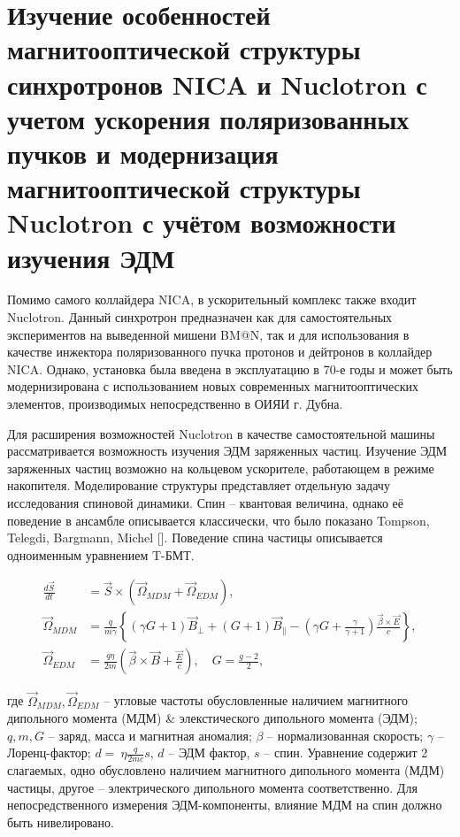 
	\chapter{Изучение особенностей магнитооптической структуры синхротронов NICA и Nuclotron с учетом ускорения поляризованных пучков и модернизация магнитооптической структуры Nuclotron с учётом возможности изучения ЭДМ}\label{ch:EDM}

\par Помимо самого коллайдера NICA, в ускорительный комплекс также входит Nuclotron. Данный синхротрон предназначен как для самостоятельных экспериментов на выведенной мишени BM@N, так и для использования в качестве инжектора поляризованного пучка протонов и дейтронов в коллайдер NICA. Однако, установка была введена в эксплуатацию в 70-е годы и может быть модернизирована с использованием новых современных магнитооптических элементов, производимых непосредственно в ОИЯИ г. Дубна.

\par Для расширения возможностей Nuclotron в качестве самостоятельной машины рассматривается возможность изучения ЭДМ заряженных частиц. Изучение ЭДМ заряженных частиц возможно на кольцевом ускорителе, работающем в режиме накопителя. Моделирование структуры представляет отдельную задачу исследования спиновой динамики. Спин – квантовая величина, однако её поведение в ансамбле описывается классически, что было показано Tompson, Telegdi, Bargmann, Michel []. Поведение спина частицы описывается одноименным уравнением T-БМТ. 

\begin{align} \label{eq:T-BMT}
\frac{{d \vec{S}}}{d t} &=\vec{S} \times\left(\vec{\Omega}_{MDM}+\vec{\Omega}_{EDM}\right), \nonumber\\
\vec{\Omega}_{MDM}&=\frac{q}{m \gamma}\left\{(\gamma G+1)\vec{B}_{\perp}+(G+1)\vec{B}_{\parallel}-\left(\gamma G+\frac{\gamma}{\gamma+1}\right) \frac{\vec{\beta} \times \vec{E}}{c}\right\}, \\
\vec{\Omega}_{EDM}&=\frac{q \eta}{2 m}\left(\vec{\beta} \times \vec{B}+\frac{\vec{E}}{c}\right), \quad G=\frac{g-2}{2},\nonumber
\end{align}

\noindent где $\vec{\Omega}_{MDM}, \vec{\Omega}_{EDM}$ -- угловые частоты обусловленные наличием магнитного дипольного момента (МДМ) \& элекстического дипольного момента (ЭДМ); $q, m, G$ -- заряд, масса и магнитная аномалия; $\beta$ -- нормализованная скорость; $\gamma$ -- Лоренц-фактор; $d =~\eta \frac{q}{2mc}s$, $d$ -- ЭДМ фактор, $s$ -- спин. Уравнение содержит 2 слагаемых, одно обусловлено наличием магнитного дипольного момента (МДМ) частицы, другое – электрического дипольного момента соответственно. Для непосредственного измерения ЭДМ-компоненты, влияние МДМ на спин должно быть нивелировано.

